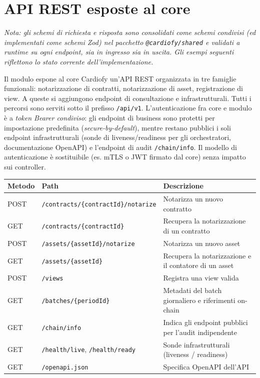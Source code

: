 \documentclass[a4paper,11pt]{article}
\begin{document}
\section{API REST esposte al core}\label{sec:api}

\noindent\textit{Nota: gli schemi di richiesta e risposta sono consolidati come schemi condivisi (ed implementati come schemi Zod) nel pacchetto \texttt{@cardiofy/shared} e validati a runtime su ogni endpoint, sia in ingresso sia in uscita. Gli esempi seguenti riflettono lo stato corrente dell'implementazione.}

\bigskip

Il modulo espone al core Cardiofy un'API REST organizzata in tre famiglie funzionali: notarizzazione di contratti, notarizzazione di asset, registrazione di view. A queste si aggiungono endpoint di consultazione e infrastrutturali. Tutti i percorsi sono serviti sotto il prefisso \texttt{/api/v1}. L'autenticazione fra core e modulo \`e a \emph{token Bearer condiviso}: gli endpoint di business sono protetti per impostazione predefinita (\emph{secure-by-default}), mentre restano pubblici i soli endpoint infrastrutturali (sonde di liveness/readiness per gli orchestratori, documentazione OpenAPI) e l'endpoint di audit \texttt{/chain/info}. Il modello di autenticazione \`e sostituibile (es. mTLS o JWT firmato dal core) senza impatto sui controller.

\begin{center}
\begin{tabularx}{\textwidth}{llX}
\toprule
\textbf{Metodo} & \textbf{Path} & \textbf{Descrizione} \\
\midrule
POST & \texttt{/contracts/\{contractId\}/notarize} & Notarizza un nuovo contratto \\
GET  & \texttt{/contracts/\{contractId\}} & Recupera la notarizzazione di un contratto \\
POST & \texttt{/assets/\{assetId\}/notarize} & Notarizza un nuovo asset \\
GET  & \texttt{/assets/\{assetId\}} & Recupera la notarizzazione e il contatore di un asset \\
POST & \texttt{/views} & Registra una view valida \\
GET  & \texttt{/batches/\{periodId\}} & Metadati del batch giornaliero e riferimenti on-chain \\
GET  & \texttt{/chain/info} & Indica gli endpoint pubblici per l'audit indipendente \\
GET  & \texttt{/health/live}, \texttt{/health/ready} & Sonde infrastrutturali (liveness / readiness) \\
GET  & \texttt{/openapi.json} & Specifica OpenAPI dell'API \\
\bottomrule
\end{tabularx}
\end{center}
\end{document}
